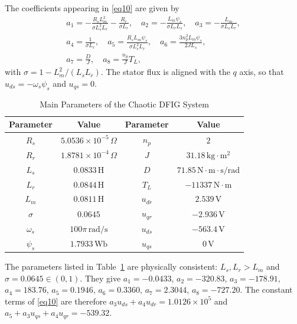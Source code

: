 \documentclass[conference]{IEEEtran}
\begin{document}
The coefficients appearing in \eqref{eq10} are given by
\begin{equation*}
\begin{gathered}
a_{1} = - \frac{R_{s}L_{m}^{2}}{\sigma L_{s}^{2}L_{r}} - \frac{R_{r}}{\sigma L_{r}},\quad a_{2} = - \frac{L_{m}\psi_{s}}{\sigma L_{r}L_{s}},\quad a_{3} = - \frac{L_{m}}{\sigma L_{s}L_{r}},\\
a_{4} = \frac{1}{\sigma L_{r}},\quad a_{5} = \frac{R_{s}L_{m}\psi_{s}}{\sigma L_{s}^{2}L_{r}},\quad
a_{6} = \frac{3n_{p}^{2}L_{m}\psi_{s}}{2JL_{s}},\\ a_{7} = \frac{D}{J},\quad a_{8} = \frac{n_{p}}{J}T_{L},
\end{gathered}
\end{equation*}
with $\sigma = 1 - L_{m}^{2}/(L_{s}L_{r})$. The stator flux is aligned with the $q$ axis, so that $u_{ds} = -\omega_{s}\psi_{s}$ and $u_{qs} = 0$.

\begin{table}[htbp]
\caption{Main Parameters of the Chaotic DFIG System}
\begin{center}
\begin{tabular}{|c|c||c|c|}
\hline
\textbf{Parameter} & \textbf{Value} & \textbf{Parameter} & \textbf{Value} \\
\hline
$R_{s}$ & $5.0536 \times 10^{-5}\,\Omega$ & $n_{p}$ & $2$ \\
\hline
$R_{r}$ & $1.8781 \times 10^{-4}\,\Omega$ & $J$ & $31.18\,\text{kg}\cdot\text{m}^2$ \\
\hline
$L_{s}$ & $0.0833\,\text{H}$ & $D$ & $71.85\,\text{N}\cdot\text{m}\cdot\text{s/rad}$ \\
\hline
$L_{r}$ & $0.0844\,\text{H}$ & $T_{L}$ & $-11337\,\text{N}\cdot\text{m}$ \\
\hline
$L_{m}$ & $0.0811\,\text{H}$ & $u_{dr}$ & $2.539\,\text{V}$ \\
\hline
$\sigma$ & $0.0645$ & $u_{qr}$ & $-2.936\,\text{V}$ \\
\hline
$\omega_{s}$ & $100\pi\,\text{rad/s}$ & $u_{ds}$ & $-563.4\,\text{V}$ \\
\hline
$\psi_{s}$ & $1.7933\,\text{Wb}$ & $u_{qs}$ & $0\,\text{V}$ \\
\hline
\end{tabular}
\label{tab1}
\end{center}
\end{table}

The parameters listed in Table~\ref{tab1} are physically consistent: $L_{s},L_{r}>L_{m}$ and $\sigma = 0.0645 \in (0,1)$. They give $a_{1} = -0.0433$, $a_{2} = -320.83$, $a_{3} = -178.91$, $a_{4} = 183.76$, $a_{5} = 0.1946$, $a_{6} = 0.3360$, $a_{7} = 2.3044$, $a_{8} = -727.20$. The constant terms of \eqref{eq10} are therefore $a_{3}u_{ds}+a_{4}u_{dr} = 1.0126\times10^{5}$ and $a_{5}+a_{3}u_{qs}+a_{4}u_{qr} = -539.32$.
\end{document}
